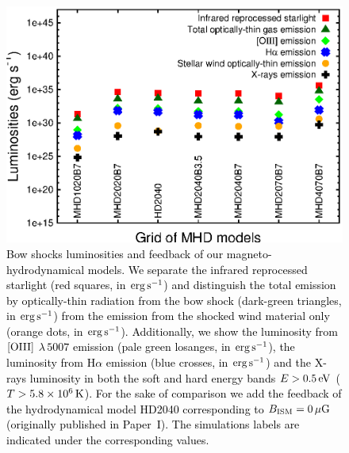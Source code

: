\documentclass[useAMS,usenatbib]{mn2e}
\begin{document}
\begin{figure}
	\begin{minipage}[b]{ 0.58\textwidth}
		\includegraphics[width=1.0\textwidth]{./luminosity_grid.eps}
	\end{minipage} 
	\caption{
	         \textcolor{black}{Bow shocks luminosities and feedback of our
magneto-hydrodynamical models. We separate the infrared reprocessed
starlight (red squares, in $\rm erg\, \rm s^{-1}$) and distinguish the total emission by
optically-thin radiation from the bow shock (dark-green triangles, in $\rm erg\,
\rm s^{-1}$) from the emission from the shocked wind material only (orange dots,
in $\rm erg\, \rm s^{-1}$). Additionally, we show the luminosity from $[\rm
O{\sc III}]$ $\lambda \, 5007$ emission (pale green losanges, in $\rm erg\, \rm
s^{-1}$), the luminosity from H$\alpha$ emission (blue crosses, in $\rm erg\,
\rm s^{-1}$) and the X-rays luminosity in both the soft and hard energy bands
$E>0.5\, \rm eV$ ($T>5.8\times10^{6}\, \rm K$). For the sake of comparison we
add the feedback of the hydrodynamical model HD2040 corresponding to $B_{\rm
ISM}=0\, \mu \rm G$ (originally published in Paper~I). The 
simulations labels are indicated under the corresponding values.} 
		 }
	\label{fig:feedback}  
\end{figure}
\end{document}
